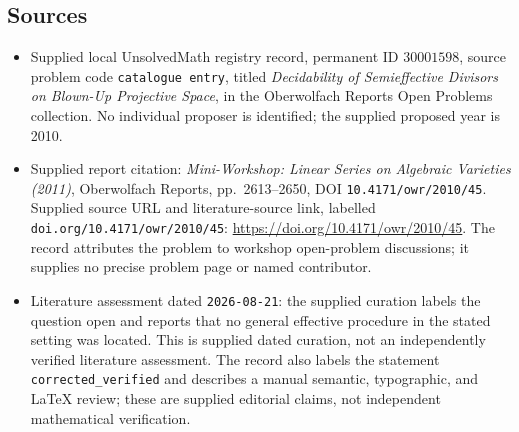 \documentclass[11pt]{article}
\begin{document}
\subsection{Sources}
\begin{itemize}
\item Supplied local UnsolvedMath registry record, permanent ID \(30001598\), source problem code \texttt{catalogue entry}, titled \emph{Decidability of Semieffective Divisors on Blown-Up Projective Space}, in the Oberwolfach Reports Open Problems collection. No individual proposer is identified; the supplied proposed year is 2010.
\item Supplied report citation: \emph{Mini-Workshop: Linear Series on Algebraic Varieties (2011)}, Oberwolfach Reports, pp.\ 2613--2650, DOI \texttt{10.4171/owr/2010/45}. Supplied source URL and literature-source link, labelled \texttt{doi.org/10.4171/owr/2010/45}: \url{https://doi.org/10.4171/owr/2010/45}. The record attributes the problem to workshop open-problem discussions; it supplies no precise problem page or named contributor.
\item Literature assessment dated \texttt{2026-08-21}: the supplied curation labels the question open and reports that no general effective procedure in the stated setting was located. This is supplied dated curation, not an independently verified literature assessment. The record also labels the statement \texttt{corrected\_verified} and describes a manual semantic, typographic, and LaTeX review; these are supplied editorial claims, not independent mathematical verification.
\end{itemize}
\end{document}
